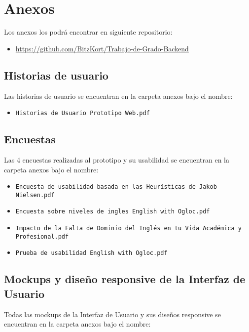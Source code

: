 \chapter*{Anexos}

Los anexos los podrá encontrar en siguiente repositorio:
\begin{itemize}
    \item \url{https://github.com/BitzKort/Trabajo-de-Grado-Backend}
\end{itemize}

\section*{Historias de usuario}

Las historias de usuario se encuentran en la carpeta anexos bajo el nombre:

\begin{itemize}
    \item \texttt{Historias de Usuario Prototipo Web.pdf}
\end{itemize}

\section*{Encuestas}
Las 4 encuestas realizadas al prototipo y su usabilidad se encuentran en la carpeta anexos bajo el nombre:

\begin{itemize}
    \item \texttt{Encuesta de usabilidad basada en las Heurísticas de Jakob Nielsen.pdf}
    \item \texttt{Encuesta sobre niveles de ingles English with Ogloc.pdf}
    \item \texttt{Impacto de la Falta de Dominio del Inglés en tu Vida Académica y Profesional.pdf}
    \item \texttt{Prueba de usabilidad English with Ogloc.pdf}
\end{itemize}


\section*{Mockups y diseño responsive de la Interfaz de Usuario}

Todas las mockups de la Interfaz de Usuario y sus diseños responsive se encuentran en la carpeta anexos bajo el nombre:

